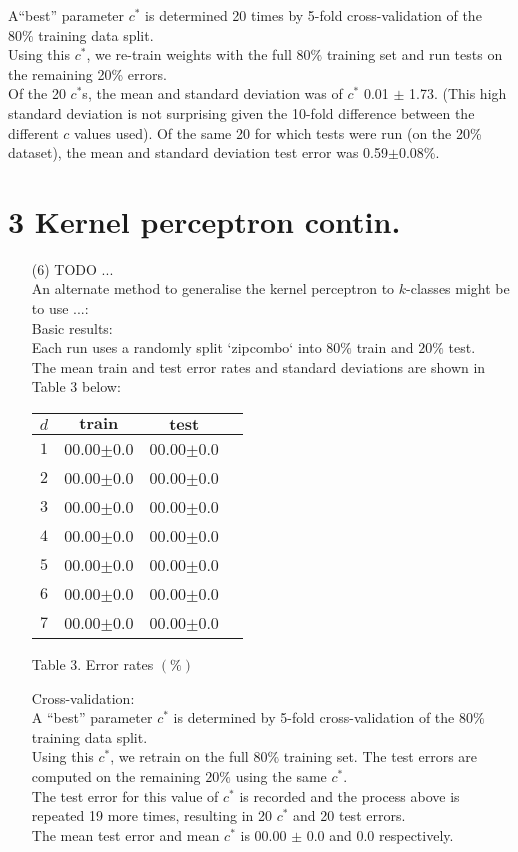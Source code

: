 \documentclass[a4paper,12pt]{article}
\begin{document}
\begin{enumerate}
A``best” parameter $c^*$ is determined 20 times by 5-fold cross-validation of the $80\%$ training data split. \\
Using this $c^*$, we re-train weights with the full $80\%$ training set and run tests on the remaining 20\% errors. \\
Of the 20 $c^*$s, the mean and standard deviation was of $c^*$ 0.01 $\pm$ 1.73. (This high standard deviation is not surprising given the 10-fold difference between the different $c$ values used).
Of the same 20 for which tests were run (on the 20\% dataset), the mean and standard deviation test error was 0.59$\pm$0.08\%.

\end{enumerate}
\clearpage
\section*{3 Kernel perceptron contin.}
\begin{enumerate}
\item[(6)] TODO ...\\

An alternate method to generalise the kernel perceptron to $k$-classes might be to use ...: \\

Basic results: \\
Each run uses a randomly split `zipcombo` into $80\%$ train and $20\%$ test. \\
The mean train and test error rates and standard deviations are shown in Table 3 below:

\begin{tabular}{|c|c|c|c|}
\hline
$d$&$\textbf{train}$&$\textbf{test}$\\
\hline
$1$&00.00$\pm$0.0&00.00$\pm$0.0\\
\hline
$2$&00.00$\pm$0.0&00.00$\pm$0.0\\
\hline
$3$&00.00$\pm$0.0&00.00$\pm$0.0\\
\hline
$4$&00.00$\pm$0.0&00.00$\pm$0.0\\
\hline
$5$&00.00$\pm$0.0&00.00$\pm$0.0\\
\hline
$6$&00.00$\pm$0.0&00.00$\pm$0.0\\
\hline
$7$&00.00$\pm$0.0&00.00$\pm$0.0\\
\hline
\end{tabular}\par 
Table 3. Error rates $(\%)$

Cross-validation: \\
A “best” parameter $c^*$ is determined by 5-fold cross-validation of the $80\%$ training data split. \\
Using this $c^*$, we retrain on the full $80\%$ training set. The test errors are computed on the remaining $20\%$ using the same $c^*$. \\
The test error for this value of $c^*$ is recorded and the process above is repeated 19 more times, resulting in 20 $c^*$ and 20 test errors.\\
The mean test error and mean $c^*$ is 00.00 $\pm$ 0.0 and 0.0 respectively.


\end{enumerate}
\clearpage
\end{document}
